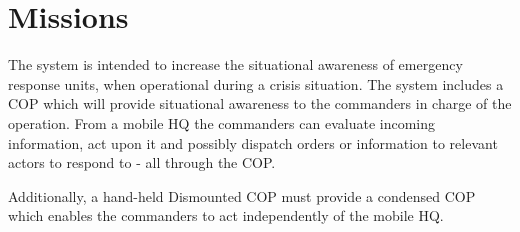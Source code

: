 \section{Missions}
The system is intended to increase the situational awareness of emergency response units, when operational during a crisis situation. The system includes a COP which will provide situational awareness to the commanders in charge of the operation. From a mobile HQ the commanders can evaluate incoming information, act upon it and possibly dispatch orders or information to relevant actors to respond to - all through the COP.

Additionally, a hand-held Dismounted COP must provide a condensed COP which enables the commanders to act independently of the mobile HQ.